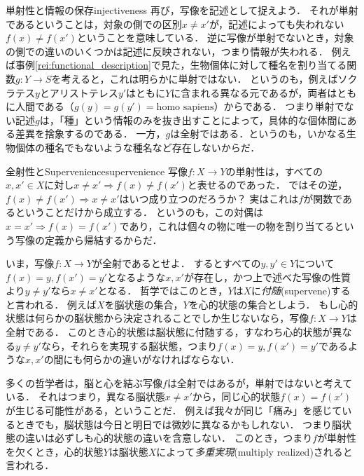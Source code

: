 \documentclass[dvipdfmx, 11pt,a4paper]{jsarticle}
\begin{document}
\begin{rei}{単射性と情報の保存}{injectiveness}
再び，写像を記述として捉えよう．
それが単射であるということは，対象の側での区別$x \neq x'$が，記述によっても失われない$f(x) \neq f(x')$ということを意味している．
逆に写像が単射でないとき，対象の側での違いのいくつかは記述に反映されない，つまり情報が失われる．
例えば事例\ref{rei:functional_description}で見た，生物個体に対して種名を割り当てる関数$g:Y \to S$を考えると，これは明らかに単射ではない．
というのも，例えばソクラテス$y$とアリストテレス$y'$はともに$Y$に含まれる異なる元であるが，両者はともに人間である（$g(y) = g(y') = \text{homo sapiens}$）からである．
つまり単射でない記述$g$は，「種」という情報のみを抜き出すことによって，具体的な個体間にある差異を捨象するのである．
一方，$g$は全射ではある．というのも，いかなる生物個体の種名でもないような種名など存在しないからだ．
\end{rei}

\begin{rei}{全射性とSupervenience}{supervenience}
写像$f:X \to Y$の単射性は，すべての$x, x' \in X$に対し$x \neq x' \Rightarrow f(x) \neq f(x')$と表せるのであった．
ではその逆，$f(x) \neq f(x') \Rightarrow x \neq x'$はいつ成り立つのだろうか？
実はこれは$f$が関数であるということだけから成立する．
というのも，この対偶は$x = x' \Rightarrow f(x) = f(x')$であり，これは個々の物に唯一の物を割り当てるという写像の定義から帰結するからだ．

いま，写像$f:X \to Y$が全射であるとせよ．
するとすべての$y, y' \in Y$について$f(x) = y, f(x') = y'$となるような$x, x'$が存在し，かつ上で述べた写像の性質より$y \neq y'$なら$x \neq x'$となる．
哲学ではこのとき，$Y$は$X$に\emph{付随}(supervene)すると言われる．
例えば$X$を脳状態の集合，$Y$を心的状態の集合としよう．
もし心的状態は何らかの脳状態から決定されることでしか生じないなら，写像$f:X \to Y$は全射である．
このとき心的状態は脳状態に付随する，すなわち心的状態が異なる$y \neq y'$なら，それらを実現する脳状態，つまり$f(x) = y, f(x') =y'$であるような$x, x'$の間にも何らかの違いがなければならない．

多くの哲学者は，脳と心を結ぶ写像$f$は全射ではあるが，単射ではないと考えている．
それはつまり，異なる脳状態$x \neq x'$から，同じ心的状態$f(x) = f(x')$が生じる可能性がある，ということだ．
例えば我々が同じ「痛み」を感じているときでも，脳状態は今日と明日では微妙に異なるかもしれない．
つまり脳状態の違いは必ずしも心的状態の違いを含意しない．
このとき，つまり$f$が単射性を欠くとき，心的状態$Y$は脳状態$X$によって\emph{多重実現}(multiply realized)されると言われる．
\end{rei}
\end{document}
